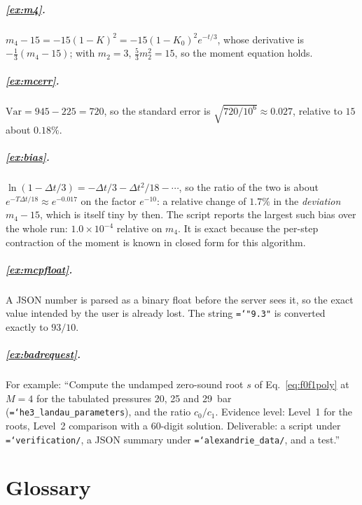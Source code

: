 \documentclass[11pt,a4paper,openany]{book}
\newcommand{\code}[1]{\texttt{\hyphenchar\font=`\-\relax #1}}
\theoremstyle{definition}
\theoremstyle{plain}
\begin{document}
\paragraph{\ref{ex:m4}.} $m_4-15=-15(1-K)^2=-15(1-K_0)^2e^{-t/3}$, whose derivative is
$-\frac13(m_4-15)$; with $m_2=3$, $\frac53m_2^2=15$, so the moment equation holds.

\paragraph{\ref{ex:mcerr}.} $\mathrm{Var}=945-225=720$, so the standard error is
$\sqrt{720/10^6}\approx0.027$, relative to $15$ about $0.18\%$.

\paragraph{\ref{ex:bias}.} $\ln(1-\Delta t/3)=-\Delta t/3-\Delta t^2/18-\cdots$, so the ratio of
the two is about $e^{-T\Delta t/18}\approx e^{-0.017}$ on the factor $e^{-10}$: a relative change
of $1.7\%$ in the \emph{deviation} $m_4-15$, which is itself tiny by then. The script reports the
largest such bias over the whole run: $1.0\times10^{-4}$ relative on $m_4$. It is exact because the per-step
contraction of the moment is known in closed form for this algorithm.

\paragraph{\ref{ex:mcpfloat}.} A JSON number is parsed as a binary float before the server sees
it, so the exact value intended by the user is already lost. The string \code{"9.3"} is converted
exactly to $93/10$.

\paragraph{\ref{ex:badrequest}.} For example: ``Compute the undamped zero-sound root $s$ of
Eq.~\eqref{eq:f0f1poly} at $M=4$ for the tabulated pressures 20, 25 and 29~bar
(\code{he3\_landau\_parameters}), and the ratio $c_0/c_1$. Evidence level: Level~1 for the roots,
Level~2 comparison with a 60-digit solution. Deliverable: a script under \code{verification/}, a
JSON summary under \code{alexandrie\_data/}, and a test.''

\chapter{Glossary}
\end{document}
